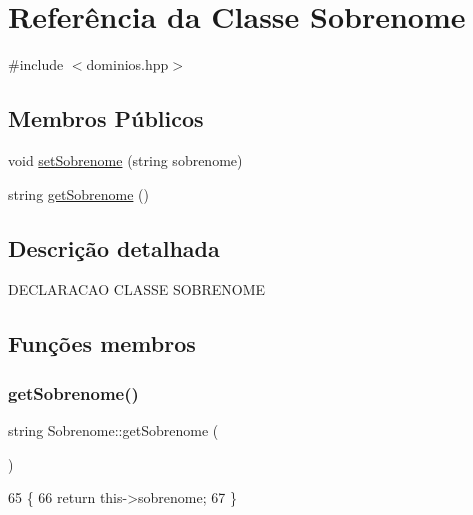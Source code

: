 \hypertarget{class_sobrenome}{}\section{Referência da Classe Sobrenome}
\label{class_sobrenome}


{\ttfamily \#include $<$dominios.\+hpp$>$}

\subsection*{Membros Públicos}
\begin{DoxyCompactItemize}
\item 
void \mbox{\hyperlink{class_sobrenome_a9dc2277e3600656838e47c86dfddd23a}{set\+Sobrenome}} (string sobrenome)
\item 
string \mbox{\hyperlink{class_sobrenome_a954491366ce07f6715f32a97d67edf04}{get\+Sobrenome}} ()
\end{DoxyCompactItemize}


\subsection{Descrição detalhada}
D\+E\+C\+L\+A\+R\+A\+C\+AO C\+L\+A\+S\+SE S\+O\+B\+R\+E\+N\+O\+ME 

\subsection{Funções membros}
\mbox{\label{class_sobrenome_a954491366ce07f6715f32a97d67edf04}} 
\subsubsection{\texorpdfstring{get\+Sobrenome()}{getSobrenome()}}
{\footnotesize\ttfamily string Sobrenome\+::get\+Sobrenome (\begin{DoxyParamCaption}{ }\end{DoxyParamCaption})}


\begin{DoxyCode}
65 \{
66   \textcolor{keywordflow}{return} this->sobrenome;
67 \}
\end{DoxyCode}
\mbox{\label{class_sobrenome_a9dc2277e3600656838e47c86dfddd23a}} 
